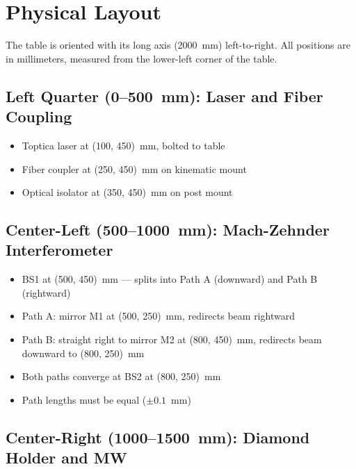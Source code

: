 \documentclass[11pt,a4paper,openany]{book}
\begin{document}

\section{Physical Layout}

The table is oriented with its long axis (2000~mm) left-to-right. All positions are in millimeters, measured from the lower-left corner of the table.

\subsection{Left Quarter (0--500~mm): Laser and Fiber Coupling}

\begin{itemize}[nosep]
  \item Toptica laser at (100, 450)~mm, bolted to table
  \item Fiber coupler at (250, 450)~mm on kinematic mount
  \item Optical isolator at (350, 450)~mm on post mount
\end{itemize}

\subsection{Center-Left (500--1000~mm): Mach-Zehnder Interferometer}

\begin{itemize}[nosep]
  \item BS1 at (500, 450)~mm --- splits into Path A (downward) and Path B (rightward)
  \item Path A: mirror M1 at (500, 250)~mm, redirects beam rightward
  \item Path B: straight right to mirror M2 at (800, 450)~mm, redirects beam downward to (800, 250)~mm
  \item Both paths converge at BS2 at (800, 250)~mm
  \item Path lengths must be equal ($\pm 0.1$~mm)
\end{itemize}

\subsection{Center-Right (1000--1500~mm): Diamond Holder and MW}
\end{document}
